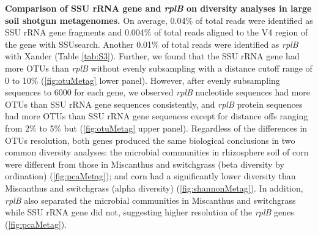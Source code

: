 \documentclass[]{msu-thesis}
\begin{document}
\textbf{Comparison of SSU rRNA gene and \textit{rplB} on diversity analyses in large soil shotgun metagenomes. }
On average, 0.04\% of total reads were identified as SSU rRNA gene fragments and 0.004\% of total reads aligned to the V4 region of the gene with SSUsearch. Another 0.01\% of total reads were identified as \textit{rplB} with Xander (Table \ref{tab:S3}). Further, we found that the SSU rRNA gene had more OTUs than \textit{rplB} without evenly subsampling with a distance cutoff range of 0 to 10\% (\cref{fig:otuMetag} lower panel). However, after evenly subsampling sequences to 6000 for each gene, we observed \textit{rplB} nucleotide sequences had more OTUs than SSU rRNA gene sequences consistently, and \textit{rplB} protein sequences had more OTUs than SSU rRNA gene sequences except for distance offs ranging from 2\% to 5\% but (\cref{fig:otuMetag} upper panel). Regardless of the differences in OTUs resolution, both genes produced the same biological conclusions in two common diversity analyses: the microbial communities in rhizosphere soil of corn were different from those in Miscanthus and switchgrass (beta diversity by ordination) (\cref{fig:pcaMetag}); and corn had a significantly lower diversity than Miscanthus and switchgrass (alpha diversity) (\cref{fig:shannonMetag}). In addition, \textit{rplB} also separated the microbial communities in Miscanthus and switchgrass while SSU rRNA gene did not, suggesting higher resolution of the \textit{rplB} genes (\cref{fig:pcaMetag}).
\end{document}
